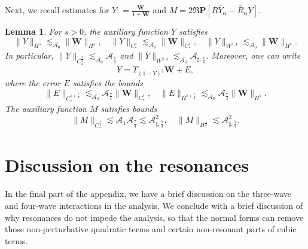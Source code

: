 \documentclass[10pt]{amsart}
\newtheorem{lemma}[theorem]{Lemma}
\theoremstyle{remark}
\theoremstyle{definition}
\numberwithin{equation}{section}
\newcommand{\f}{\frac}
\newcommand{\bw}{\mathbf{W}}
\newcommand{\nP}{{\mathbf P}}
\newcommand{\CalAZ}{{\mathcal{A}_0}}
\newcommand{\ASSharp}{{\mathcal{A}_{\sharp,\frac{7}{4}}^2}}
\begin{document}
Next, we recall estimates for $Y : = \frac{\bw}{1+\bw}$ and $M = 2\Re \nP[R\bar{Y}_\alpha - \bar{R}_\alpha Y]$.
\begin{lemma}
For $s>0$, the auxiliary function $Y$ satisfies
\begin{equation}
\|Y\|_{H^s} \lesssim_\CalAZ \|\bw\|_{H^s}, \quad \|Y\|_{C^s_{*}} \lesssim_\CalAZ \|\bw\|_{C^s_{*}}, \quad \|Y\|_{W^{s,4}}  \lesssim_\CalAZ \|\bw\|_{H^s}. \label{YMoser}
\end{equation}
In particular, $\|Y\|_{C^{\f74}_{*}} \lesssim_\CalAZ \mathcal{A}_{\f74}$ and $\|Y\|_{W^{2,4}} \lesssim_\CalAZ \mathcal{A}_{\sharp,\f74}$.
Moreover, one can write
\begin{equation}
    Y = T_{(1-Y)^2}\bw + E, \label{YWExpression}
\end{equation}
where the error $E$ satisfies the bounds
\begin{equation*}
\|E\|_{C_*^{s+\f74}} \lesssim_\CalAZ \mathcal{A}_{\f74} \|\bw\|_{C_*^{s}}, \quad\|E\|_{H^{s+\f74}} \lesssim_\CalAZ  \mathcal{A}_{\f74} \|\bw\|_{H^{s}}.
\end{equation*}
The auxiliary function $M$ satisfies bounds
\begin{equation} \label{MBound}
\| M\|_{C^\f14_{*}} \lesssim \mathcal{A}_1 \mathcal{A}_{\f74} \lesssim \ASSharp, \quad \| M\|_{H^\f12} \lesssim \ASSharp.
\end{equation}
\end{lemma}

\section{Discussion on the resonances} \label{s:Discuss}
In the final part of the appendix, we have a brief discussion on the three-wave and four-wave interactions in the analysis.
We conclude with a brief discussion of why resonances do not impede the analysis, so that the normal forms can remove those non-perturbative quadratic terms and certain non-resonant parts of cubic terms.
\end{document}
